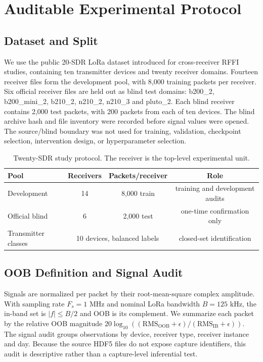 \section{Auditable Experimental Protocol}
\label{sec:protocol}
\subsection{Dataset and Split}
We use the public 20-SDR LoRa dataset introduced for cross-receiver RFFI studies, containing ten transmitter devices and twenty receiver domains. Fourteen receiver files form the development pool, with 8,000 training packets per receiver. Six official receiver files are held out as blind test domains: b200\_2, b200\_mini\_2, b210\_2, n210\_2, n210\_3 and pluto\_2. Each blind receiver contains 2,000 test packets, with 200 packets from each of ten devices. The blind archive hash and file inventory were recorded before signal values were opened. The source/blind boundary was not used for training, validation, checkpoint selection, intervention design, or hyperparameter selection.

\begin{table}[t]
\caption{Twenty-SDR study protocol. The receiver is the top-level experimental unit.}
\label{tab:protocol}
\centering\footnotesize
\begin{tabular}{lccc}
\toprule
Pool & Receivers & Packets/receiver & Role\\
\midrule
Development & 14 & 8,000 train & training and development audits\\
Official blind & 6 & 2,000 test & one-time confirmation only\\
Transmitter classes & \multicolumn{2}{c}{10 devices, balanced labels} & closed-set identification\\
\bottomrule
\end{tabular}
\end{table}

\subsection{OOB Definition and Signal Audit}
Signals are normalized per packet by their root-mean-square complex amplitude. With sampling rate $F_s=1$ MHz and nominal LoRa bandwidth $B=125$ kHz, the in-band set is $|f|\leq B/2$ and OOB is its complement. We summarize each packet by the relative OOB magnitude $20\log_{10}((\mathrm{RMS}_{\mathrm{OOB}}+\epsilon)/(\mathrm{RMS}_{\mathrm{IB}}+\epsilon))$. The signal audit groups observations by device, receiver type, receiver instance and day. Because the source HDF5 files do not expose capture identifiers, this audit is descriptive rather than a capture-level inferential test.

